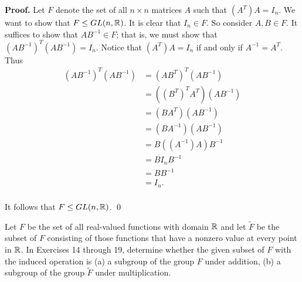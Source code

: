 \begin{enumerate}
      \textbf{Proof.} Let $F$ denote the set of all $n \times n$ matrices $A$
      such that $(A^T)A = I_n$. We want to show that $F \le GL(n, \mathbb{R})$. It is
      clear that $I_n \in F$. So consider $A, B \in F$. It suffices to show that
      $AB^{-1} \in F$; that is, we must show that $(AB^{-1})^T(AB^{-1}) = I_n$. 
      Notice that $(A^T)A = I_n$ if and only if $A^{-1} = A^T$. Thus
      \begin{align*}
         (AB^{-1})^T(AB^{-1}) &= (AB^T)^T(AB^{-1}) \\ 
                              &= ((B^T)^TA^T)(AB^{-1}) \\
                              &= (BA^T)(AB^{-1}) \\
                              &= (BA^{-1})(AB^{-1}) \\
                              &= B((A^{-1})A)B^{-1} \\
                              &= BI_nB^{-1} \\
                              &= BB^{-1} \\
                              &= I_n. \\
      \end{align*}

      It follows that $F \le GL(n, \mathbb{R})$. \qed
\end{enumerate}

\noindent      Let $F$ be the set of all real-valued functions with domain $\mathbb{R}$
               and let $\tilde{F}$ be the subset of $F$ consisting of those
               functions that have a nonzero value at every point in $\mathbb{R}$. In
               Exercises 14 through 19, determine whether the given subset of
               $F$ with the induced operation is (a) a subgroup of the group $F$
               under addition, (b) a subgroup of the group $\tilde{F}$ under
               multiplication.

